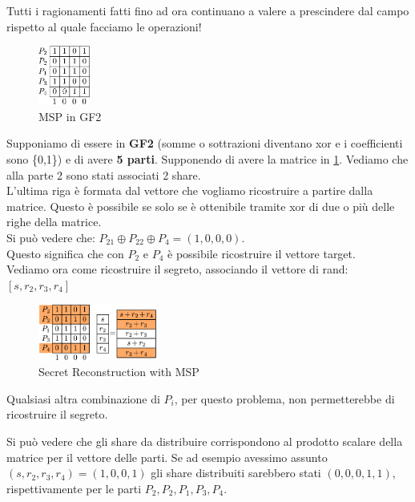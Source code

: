 \begin{note}
Tutti i ragionamenti fatti fino ad ora continuano a valere a prescindere dal campo rispetto al quale facciamo le operazioni!
\end{note}
\begin{example}
\begin{figure}
  \vspace{-20pt}
  \begin{center}
    \includegraphics[width=0.15\textwidth]{image/lsss/gf2.png}
  \end{center}
  \vspace{-10pt}
  \caption{MSP in GF2}
  \label{fig:mspgf2}
  \vspace{-10pt}
\end{figure}
Supponiamo di essere in \textbf{GF2} (somme o sottrazioni diventano xor e i coefficienti sono \{0,1\}) e di avere \textbf{5 parti}. Supponendo di avere la matrice in \cref{fig:mspgf2}.
Vediamo che alla parte 2 sono stati associati 2 share.\\ 
L'ultima riga è formata dal vettore che vogliamo ricostruire a partire dalla matrice. Questo è possibile se solo se è ottenibile tramite xor di due o più delle righe della matrice.\\
Si può vedere che: $P_{21}\oplus P_{22}\oplus P_4 =(1,0,0,0)$.\\
Questo significa che con $P_2$ e $P_4$ è possibile ricostruire il vettore target.\\
Vediamo ora come ricostruire il segreto, associando il vettore di rand: $[s,r_2,r_3,r_4]$
\begin{figure}[h]
    \centering
    \includegraphics[width=0.35\textwidth]{image/lsss/gf2ss.png}
    \caption{Secret Reconstruction with MSP}
    \label{fig:mspss}
\end{figure}
\begin{note}
Qualsiasi altra combinazione di $P_i$, per questo problema, non permetterebbe di ricostruire il segreto.
\end{note}
\begin{note}
Si può vedere che gli share da distribuire corrispondono al prodotto scalare della matrice per il vettore delle parti. Se ad esempio avessimo assunto $(s,r_2,r_3,r_4)=(1,0,0,1)$ gli share distribuiti sarebbero stati $(0,0,0,1,1)$, rispettivamente per le parti $P_2,P_2,P_1,P_3,P_4$.
\end{note}
\end{example}
